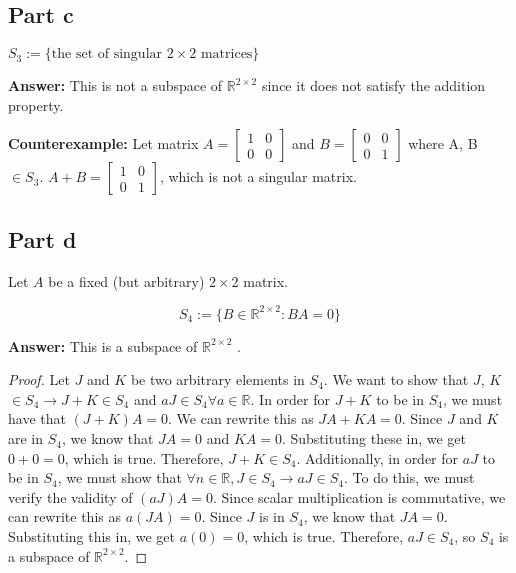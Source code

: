 \documentclass{article}
\begin{document}
\subsection*{Part c}
$S_{3} := \{\text{the set of singular } 2 \times 2 \text{ matrices}\}$

\textbf{Answer:} This is not a subspace of $\mathbb{R}^{2 \times 2}$ since it does not satisfy the addition property. %

\textbf{Counterexample:} Let matrix $A = \begin{bmatrix} 1 & 0 \\ 0 & 0 \end{bmatrix}$ and $B = \begin{bmatrix} 0 & 0 \\ 0 & 1 \end{bmatrix}$ where A, B $\in S_{3}$.
$A + B = \begin{bmatrix} 1 & 0 \\ 0 & 1 \end{bmatrix}$, which is not a singular matrix.

\subsection*{Part d}
Let \( A \) be a fixed (but arbitrary) \( 2 \times 2 \) matrix. 

\[ S_{4} := \{B \in \mathbb{R}^{2 \times 2} : BA = 0\} \]

\textbf{Answer:} This is a subspace of $\mathbb{R}^{2 \times 2}$ .

\begin{proof}
Let $J$ and $K$ be two arbitrary elements in $S_{4}$.
We want to show that $J$, $K$ $\in S_{4} \rightarrow J + K \in S_{4}$ and $aJ \in S_{4} \forall a \in \mathbb{R}$.
In order for $J + K$ to be in $S_{4}$, we must have that $(J+K)A = 0$.
We can rewrite this as $JA + KA = 0$.
Since $J$ and $K$ are in $S_{4}$, we know that $JA = 0$ and $KA = 0$.
Substituting these in, we get $0 + 0 = 0$, which is true.
Therefore, $J + K \in S_{4}$.
Additionally, in order for $aJ$ to be in $S_{4}$, we must show that $\forall n \in \mathbb{R}, J \in S_{4} \rightarrow aJ \in S_{4}$.
To do this, we must verify the validity of $(aJ)A = 0$.
Since scalar multiplication is commutative, we can rewrite this as $a(JA) = 0$.
Since $J$ is in $S_{4}$, we know that $JA = 0$.
Substituting this in, we get $a(0) = 0$, which is true.
Therefore, $aJ \in S_{4}$, so $S_{4}$ is a subspace of $\mathbb{R}^{2 \times 2}$.
\end{proof}
\end{document}
